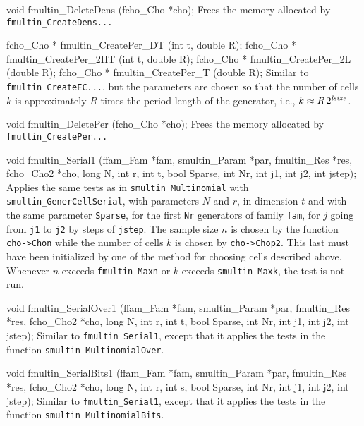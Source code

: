 void fmultin_DeleteDens (fcho_Cho *cho);
\endcode
 \tab
  Frees the memory allocated by {\tt fmultin\_CreateDens...}
 \endtab
\code


fcho_Cho * fmultin_CreatePer_DT (int t, double R);
fcho_Cho * fmultin_CreatePer_2HT (int t, double R);
fcho_Cho * fmultin_CreatePer_2L (double R);
fcho_Cho * fmultin_CreatePer_T (double R);
\endcode
\tab Similar to {\tt fmultin\_CreateEC...}, but the parameters are chosen
   so that the number of cells $k$ is approximately $R$ times the
   period length of the generator, i.e., $k \approx R\, 2^{\it lsize}$.
\endtab
\code


void fmultin_DeletePer (fcho_Cho *cho);
\endcode
 \tab
  Frees the memory allocated by {\tt fmultin\_CreatePer...}
 \endtab




\code

void fmultin_Serial1 (ffam_Fam *fam, smultin_Param *par,
                      fmultin_Res *res, fcho_Cho2 *cho,
                      long N, int r, int t, bool Sparse,
                      int Nr, int j1, int j2, int jstep);
\endcode
\tab
 Applies the same tests as in {\tt smultin\_Multinomial}
 with {\tt smultin\_GenerCellSerial},
 with parameters $N$ and $r$, in
  dimension $t$ and with the same parameter {\tt Sparse}, for the
  first {\tt Nr} generators of family {\tt fam}, for $j$ going from
  {\tt j1} to {\tt j2} by steps of {\tt jstep}.
 The sample size $n$ is chosen by the function
 {\tt cho->Chon} while the number of cells $k$ is chosen by {\tt cho->Chop2}.
 This last must have been initialized by one of
 the method for choosing cells described above.
 Whenever $n$ exceeds {\tt fmultin\_Maxn} or $k$ exceeds
 {\tt smultin\_Maxk}, the test is not run.
\endtab
\code


void fmultin_SerialOver1 (ffam_Fam *fam, smultin_Param *par,
                          fmultin_Res *res, fcho_Cho2 *cho,
                          long N, int r, int t, bool Sparse,
                          int Nr, int j1, int j2, int jstep);
\endcode
\tab
 Similar to {\tt fmultin\_Serial1}, except that it applies the
  tests in the function {\tt smultin\_Multi\-no\-mialOver}.
\endtab
\code


void fmultin_SerialBits1 (ffam_Fam *fam, smultin_Param *par,
                          fmultin_Res *res, fcho_Cho2 *cho,
                          long N, int r, int s, bool Sparse,
                          int Nr, int j1, int j2, int jstep);
\endcode
\tab
 Similar to {\tt fmultin\_Serial1}, except that it applies the
 tests in the function {\tt smultin\_Multi\-no\-mialBits}.
\endtab
\code


